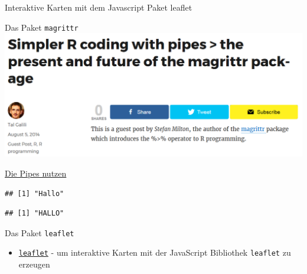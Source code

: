 \documentclass[ignorenonframetext,]{beamer}
\newenvironment{Shaded}{}{}
\newcommand{\KeywordTok}[1]{\textcolor[rgb]{0.00,0.44,0.13}{\textbf{{#1}}}}
\newcommand{\DecValTok}[1]{\textcolor[rgb]{0.25,0.63,0.44}{{#1}}}
\newcommand{\StringTok}[1]{\textcolor[rgb]{0.25,0.44,0.63}{{#1}}}
\newcommand{\NormalTok}[1]{{#1}}
\providecommand{\tightlist}{%
\setlength{\itemsep}{0pt}\setlength{\parskip}{0pt}}
\begin{document}
\begin{frame}[fragile]{Interaktive Karten mit dem Javascript Paket
leaflet}
\begin{block}{Das Paket \texttt{magrittr}}
\includegraphics{./tex2pdf.9796/8ac87890df6a93266eed3c9d0aeb31b8524671e7.png}

\end{block}

\begin{block}{\href{https://www.r-bloggers.com/more-readable-code-with-pipes-in-r/}{Die
Pipes nutzen}}

\begin{Shaded}
\end{Shaded}

\begin{verbatim}
## [1] "Hallo"
\end{verbatim}

\begin{Shaded}
\end{Shaded}

\begin{verbatim}
## [1] "HALLO"
\end{verbatim}

\end{block}

\begin{block}{Das Paket \texttt{leaflet}}

\begin{itemize}
\tightlist
\item
  \href{https://rstudio.github.io/leaflet/}{\texttt{leaflet}} - um
  interaktive Karten mit der JavaScript Bibliothek \texttt{leaflet} zu
  erzeugen
\end{itemize}


\end{block}
\end{frame}
\end{document}
